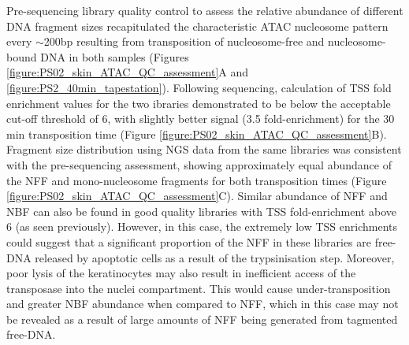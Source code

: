 Pre-sequencing library quality control to assess the relative abundance of different DNA fragment sizes recapitulated the characteristic ATAC nucleosome pattern every $\sim$200bp resulting from transposition of nucleosome-free and nucleosome-bound DNA in both samples (Figures \ref{figure:PS02_skin_ATAC_QC_assessment}A and \ref{figure:PS2_40min_tapestation}). Following sequencing, calculation of TSS fold enrichment values for the two ibraries demonstrated to be below the acceptable cut-off threshold of 6, with slightly better signal (3.5 fold-enrichment) for the 30 min transposition time (Figure \ref{figure:PS02_skin_ATAC_QC_assessment}B). Fragment size distribution using NGS data from the same libraries was consistent with the pre-sequencing assessment, showing approximately equal abundance of the NFF and mono-nucleosome fragments for both transposition times (Figure \ref{figure:PS02_skin_ATAC_QC_assessment}C). Similar abundance of NFF and NBF can also be found in good quality libraries with TSS fold-enrichment above 6 (as seen previously). However, in this case, the extremely low TSS enrichments could suggest that a significant proportion of the NFF in these libraries are free-DNA released by apoptotic cells as a result of the trypsinisation step. Moreover, poor lysis of the keratinocytes may also result in inefficient access of the transposase into the nuclei compartment. This would cause under-transposition and greater NBF abundance when compared to NFF, which in this case may not be revealed as a result of large amounts of NFF being generated from tagmented free-DNA.



